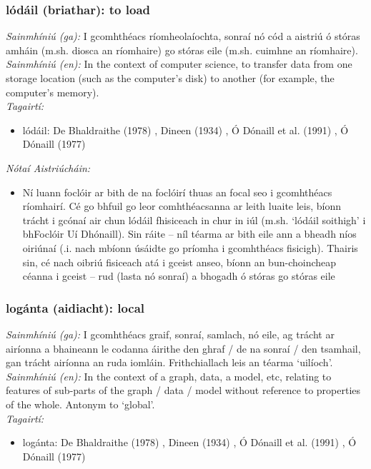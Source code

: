 \subsubsection*{lódáil (briathar): to load}
 \noindent \textit{Sainmhíniú (ga):} I gcomhthéacs ríomheolaíochta, sonraí nó cód a aistriú ó stóras amháin (m.sh. diosca an ríomhaire) go stóras eile (m.sh. cuimhne an ríomhaire).
\\
 \noindent \textit{Sainmhíniú (en):} In the context of computer science, to transfer data from one storage location (such as the computer's disk) to another (for example, the computer's memory).
\\
 \noindent \textit{Tagairtí:}
\begin{itemize}
	\item lódáil: De Bhaldraithe (1978) \cite{de-bhaldraithe}, Dineen (1934) \cite{dineen}, Ó Dónaill et al. (1991) \cite{focloir-beag}, Ó Dónaill (1977) \cite{odonaill}
\end{itemize}

 \noindent \textit{Nótaí Aistriúcháin:}
\begin{itemize}
	\item Ní luann foclóir ar bith de na foclóirí thuas an focal seo i gcomhthéacs ríomhairí. Cé go bhfuil go leor comhthéacsanna ar leith luaite leis, bíonn trácht i gcónaí air chun lódáil fhisiceach in chur in iúl (m.sh. `lódáil soithigh' i bhFoclóir Uí Dhónaill). Sin ráite -- níl téarma ar bith eile ann a bheadh níos oiriúnaí (.i. nach mbíonn úsáidte go príomha i gcomhthéacs fisicigh). Thairis sin, cé nach oibriú fisiceach atá i gceist anseo, bíonn an bun-choincheap céanna i gceist -- rud (lasta nó sonraí) a bhogadh ó stóras go stóras eile
\end{itemize}


\subsubsection*{logánta (aidiacht): local}
 \noindent \textit{Sainmhíniú (ga):} I gcomhthéacs graif, sonraí, samlach, nó eile, ag trácht ar airíonna a bhaineann le codanna áirithe den ghraf / de na sonraí / den tsamhail, gan trácht airíonna an ruda iomláin. Frithchiallach leis an téarma `uilíoch'.
\\
 \noindent \textit{Sainmhíniú (en):} In the context of a graph, data, a model, etc, relating to features of sub-parts of the graph / data / model without reference to properties of the whole. Antonym to `global'.
\\
 \noindent \textit{Tagairtí:}
\begin{itemize}
	\item logánta: De Bhaldraithe (1978) \cite{de-bhaldraithe}, Dineen (1934) \cite{dineen}, Ó Dónaill et al. (1991) \cite{focloir-beag}, Ó Dónaill (1977) \cite{odonaill}
\end{itemize}

